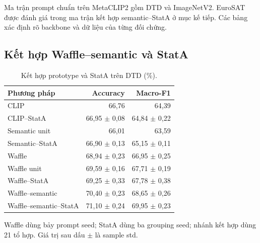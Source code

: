\documentclass[12pt,a4paper]{article}
\newcommand{\BodySize}{13}
\newcommand{\BodyLeading}{15.6}
\newcommand{\BodyFont}{\fontsize{\BodySize}{\BodyLeading}\selectfont}
\numberwithin{figure}{section}
\numberwithin{table}{section}
\numberwithin{equation}{section}
\begin{document}
Ma trận prompt chuẩn trên MetaCLIP2 gồm DTD và ImageNetV2. EuroSAT được đánh giá trong ma trận kết hợp semantic--StatA ở mục kế tiếp. Các bảng xác định rõ backbone và dữ liệu của từng đối chứng.

\subsection{Kết hợp Waffle--semantic và StatA}

\begin{table}[H]

    \centering
    \BodyFont
    \caption{Kết hợp prototype và StatA trên DTD (\%).}
    \begin{tabularx}{\linewidth}{@{}L R R@{}}
        \toprule
        Phương pháp & Accuracy & Macro-F1 \\
        \midrule
        CLIP & 66,76 & 64,39 \\
        CLIP--StatA & 66,95 $\pm$ 0,08 & 64,84 $\pm$ 0,22 \\
        Semantic unit & 66,01 & 63,59 \\
        Semantic--StatA & 66,90 $\pm$ 0,13 & 65,15 $\pm$ 0,11 \\
        Waffle & 68,94 $\pm$ 0,23 & 66,95 $\pm$ 0,25 \\
        Waffle unit & 69,59 $\pm$ 0,16 & 67,71 $\pm$ 0,19 \\
        Waffle--StatA & 69,25 $\pm$ 0,33 & 67,78 $\pm$ 0,38 \\
        Waffle--semantic & 70,40 $\pm$ 0,23 & 68,65 $\pm$ 0,26 \\
        Waffle--semantic--StatA & 71,10 $\pm$ 0,24 & 69,95 $\pm$ 0,23 \\
        \bottomrule
    \end{tabularx}
    \par\medskip
    \begin{minipage}{\linewidth}
        \BodyFont
Waffle dùng bảy prompt seed; StatA dùng ba grouping seed;
nhánh kết hợp dùng 21 tổ hợp. Giá trị sau dấu $\pm$ là sample std.
    
\end{minipage}

\end{table}
\end{document}
